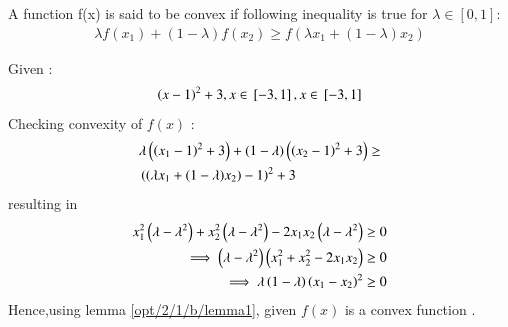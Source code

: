 
\begin{lemma}
A function f(x) is said to be convex if following inequality is true for $\lambda \in [0,1] :$  \label{opt/2/1/b/lemma1}
\begin{align}
    \lambda f(x_1) + (1-\lambda)f(x_2) \geq f(\lambda x_1 + (1-\lambda)x_2)
\end{align}
\end{lemma}
Given :
\begin{align}
    \left(x-1\right)^2+3,x \in {}\left[-3,1\right] , x \in {}\left[-3,1\right]
\end{align}
Checking convexity of $f(x)$ :
\begin{equation}
\begin{aligned}
    &\lambda\left(\left(x_1-1\right)^2+3\right) + (1-\lambda)\left(\left(x_2-1\right)^2+3\right) \geq \\
    &\left(\left(\lambda x_1 + (1-\lambda)x_2\right)-1\right)^2 +3
\end{aligned}
\end{equation}
resulting in
\begin{align}
    x_1^2\left(\lambda-\lambda^2\right)+x_2^2\left({\lambda-\lambda^2}\right)- 2x_1x_2\left({\lambda-\lambda^2}\right) &\geq 0 \\
    \implies \left(\lambda-\lambda^2\right)\left(x_1^2+x_2^2-2x_1x_2\right) &\geq 0 \\
    \implies \lambda\left(1-\lambda\right)\left(x_1-x_2\right)^2 &\geq 0 
\end{align}
Hence,using lemma \ref{opt/2/1/b/lemma1}, given $f(x)$ is a convex function .

